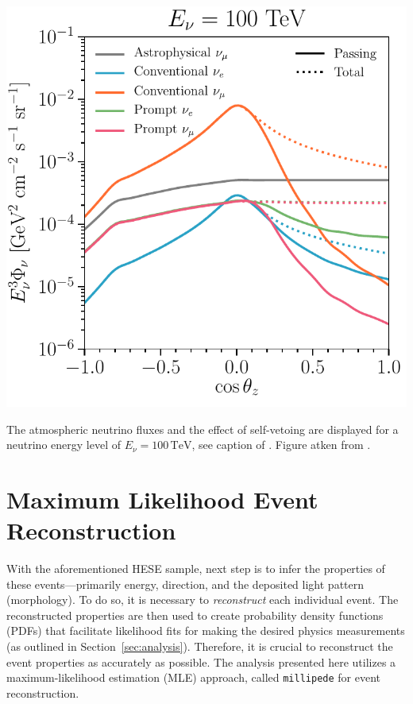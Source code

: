 \begin{marginfigure}
	\includegraphics{./figures/EventSample/fig1_fluxes_100.pdf}
	\caption{The atmospheric neutrino fluxes and the effect of self-vetoing are displayed for a neutrino energy level of \( E_\nu = 100 \, \text{TeV} \), see caption of . Figure atken from \cite{pass_frac}.}
\end{marginfigure}

\section{Maximum Likelihood Event Reconstruction}
\label{sec:reco}
With the aforementioned HESE sample, next step is to infer the properties of these events—primarily energy, direction, and the deposited light pattern (morphology). To do so, it is necessary to \emph{reconstruct} each individual event. The reconstructed properties are then used to create probability density functions (PDFs) that facilitate likelihood fits for making the desired physics measurements (as outlined in Section~\ref{sec:analysis}). Therefore, it is crucial to reconstruct the event properties as accurately as possible. The analysis presented here utilizes a maximum-likelihood estimation (MLE) approach, called \texttt{millipede} for event reconstruction. 

